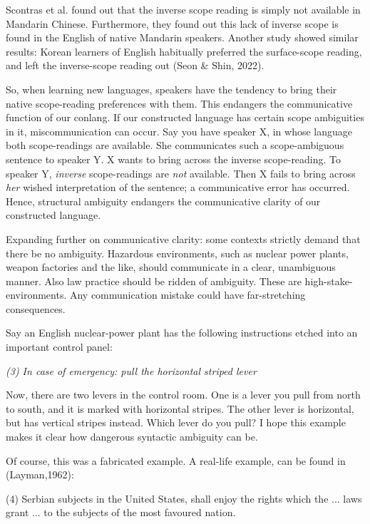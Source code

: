 \noindent Scontras et al. found out that the inverse scope reading is simply not available in Mandarin Chinese. Furthermore, they found out this lack of inverse scope is found in the English of native Mandarin speakers. Another study showed similar results: Korean learners of English habitually preferred the surface-scope reading, and left the inverse-scope reading out (Seon \& Shin, 2022). 

So, when learning new languages, speakers have the tendency to bring their native scope-reading preferences with them. This endangers the communicative function of our conlang. If our constructed language has certain scope ambiguities in it, miscommunication can occur. Say you have speaker X, in whose language both scope-readings are available. She communicates such a scope-ambiguous sentence to speaker Y. X wants to bring across the inverse scope-reading. To speaker Y, {\it inverse} scope-readings are {\it not} available. Then X fails to bring across {\it her} wished interpretation of the sentence; a communicative error has occurred. Hence, structural ambiguity endangers the communicative clarity of our constructed language. 

Expanding further on communicative clarity: some contexts strictly demand that there be no ambiguity. Hazardous environments, such as nuclear power plants, weapon factories and the like, should communicate in a clear, unambiguous manner. Also law practice should be ridden of ambiguity. These are high-stake-environments. Any communication mistake could have far-stretching consequences. 

Say an English nuclear-power plant has the following instructions etched into an important control panel: 

\begin{center}
	{\it (3) In case of emergency: pull the horizontal striped lever} 
\end{center}

\noindent Now, there are two levers in the control room. One is a lever you pull from north to south, and it is marked with horizontal stripes. The other lever is horizontal, but has vertical stripes instead. Which lever do you pull? I hope this example makes it clear how dangerous syntactic ambiguity can be. 

Of course, this was a fabricated example. A real-life example, can be found in (Layman,1962):

\begin{singlespace*}
{\center  \it

	(4) Serbian subjects in the United States, shall enjoy
the rights which the ... laws grant ... to the subjects of the most favoured nation. 
}
\end{singlespace*}

